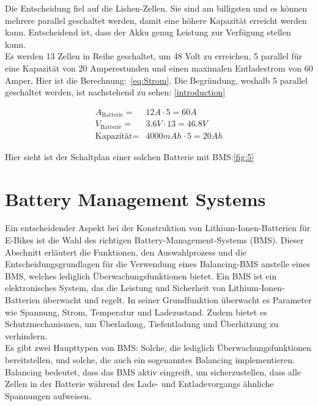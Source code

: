 Die Entscheidung fiel auf die Lishen-Zellen.
Sie sind am billigsten und es können mehrere parallel geschaltet werden, damit eine höhere Kapazität erreicht werden kann.
Entscheidend ist, dass der Akku genug Leistung zur Verfügung stellen kann.\\

Es werden 13 Zellen in Reihe geschaltet, um 48 Volt zu erreichen, 5 parallel für eine Kapazität von 20 Amperestunden und einen maximalen Entladestrom von 60 Amper.
Hier ist die Berechnung:~\ref{eq:Strom}.
Die Begründung, weshalb 5 parallel geschaltet werden, ist nachstehend zu sehen: \ref{introduction}

\begin{align}
    A_{\textrm{Batterie}} =& 12 A\cdot 5 = 60 A\\
    V_{\textrm{Batterie}} =& 3.6V \cdot 13 = 46.8V\\
    \textrm{Kapazität} =& 4000mAh \cdot 5 = 20 Ah
    \label{eq:Strom}
\end{align}

Hier sieht ist der Schaltplan einer solchen Batterie mit BMS:\ref{fig:5}





\section{Battery Management Systems}
Ein entscheidender Aspekt bei der Konstruktion von Lithium-Ionen-Batterien für E-Bikes ist die Wahl des richtigen Battery-Management-Systems (BMS). Dieser Abschnitt erläutert die Funktionen, den Auswahlprozess und die Entscheidungsgrundlagen für die Verwendung eines Balancing-BMS anstelle eines BMS, welches lediglich Überwachungsfunktionen bietet.
Ein BMS ist ein elektronisches System, das die Leistung und Sicherheit von Lithium-Ionen-Batterien überwacht und regelt.
In seiner Grundfunktion überwacht es Parameter wie Spannung,
Strom, Temperatur und Ladezustand.
Zudem bietet es Schutzmechanismen, um Überladung, Tiefentladung und Überhitzung zu verhindern.\\
Es gibt zwei Haupttypen von BMS: Solche, die lediglich Überwachungsfunktionen bereitstellen, und solche, die auch ein sogenanntes Balancing implementieren.
Balancing bedeutet, dass das BMS aktiv eingreift, um sicherzustellen, dass alle Zellen in der Batterie während des Lade- und Entladevorgangs ähnliche Spannungen aufweisen.\\


